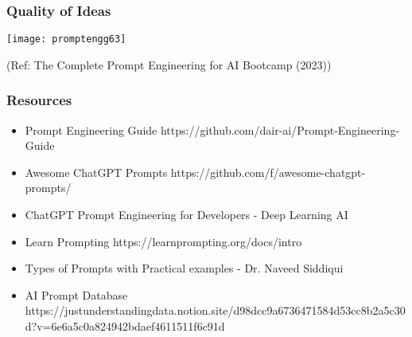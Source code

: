 \begin{frame}[fragile]\frametitle{Quality of Ideas}

\begin{center}
\texttt{[image: promptengg63]}

{\tiny (Ref: The Complete Prompt Engineering for AI Bootcamp (2023))}

\end{center}				
\end{frame}


\begin{frame}[fragile]\frametitle{Resources}
\begin{itemize}
\item Prompt Engineering Guide https://github.com/dair-ai/Prompt-Engineering-Guide
\item Awesome ChatGPT Prompts https://github.com/f/awesome-chatgpt-prompts/
\item ChatGPT Prompt Engineering for Developers - Deep Learning AI
\item Learn Prompting https://learnprompting.org/docs/intro
\item Types of Prompts with Practical examples - Dr. Naveed Siddiqui 
\item AI Prompt Database https://justunderstandingdata.notion.site/d98dcc9a6736471584d53cc8b2a5c30d?v=6e6a5c0a824942bdaef4611511f6c91d
\end{itemize}	 
\end{frame}

